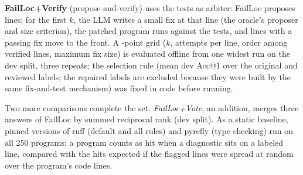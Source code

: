 \textbf{FailLoc+Verify} (propose-and-verify) uses the tests as arbiter: FailLoc proposes lines; for the first $k$, the LLM
writes a small fix at that line (the oracle's proposer and size criterion), the patched program runs against the tests,
and lines with a passing fix move to the front. A \PavGridSize-point grid ($k$, attempts per line, order among verified
lines, maximum fix size) is evaluated offline from one widest run on the dev split, three repeats; the selection rule
(mean dev Acc@1 over the original and reviewed labels; the repaired labels are excluded because they were built by the
same fix-and-test mechanism) was fixed in code before running.

Two more comparisons complete the set. \emph{FailLoc+Vote}, an addition, merges three answers of FailLoc by summed reciprocal rank (dev split). As a static baseline, pinned versions of ruff (default and all rules) and pyrefly (type checking) run on all 250
programs; a program counts as hit when a diagnostic sits on a labeled line, compared with the hits expected if the
flagged lines were spread at random over the program's code lines.
